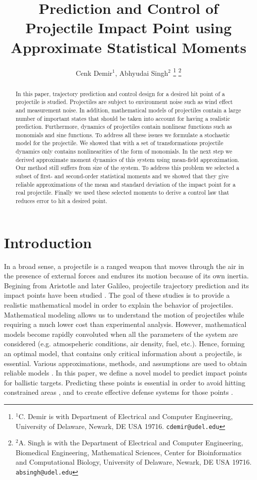 \documentclass[letterpaper, 10 pt, conference]{ieeeconf}  %
\title{\LARGE \bf
Prediction and Control of Projectile Impact Point using Approximate Statistical Moments}
\author{Cenk Demir$^{1}$, Abhyudai Singh$^{2}$
\thanks{$^{1}$C. Demir is with Department of Electrical and Computer Engineering, University of Delaware, Newark, DE USA 19716. {\tt\small cdemir@udel.edu}}
\thanks{$^{2}$A. Singh is with the Department of Electrical and Computer Engineering, Biomedical Engineering, Mathematical Sciences, Center for Bioinformatics and Computational Biology, University of Delaware, Newark, DE USA 19716.
{\tt\small absingh@udel.edu}}}
\begin{document}
\maketitle
\thispagestyle{empty}
\pagestyle{empty}


\begin{abstract}
In this paper, trajectory prediction and control design for a desired hit point of a projectile is studied. Projectiles are subject to environment noise such as wind effect and measurement noise. In addition, mathematical models of projectiles contain a large number of important states that should be taken into account for having a realistic prediction. Furthermore, dynamics of projectiles contain nonlinear functions such as monomials and sine functions. To address all these issues we formulate a stochastic model for the projectile. We showed that with a set of transformations projectile dynamics only contains nonlinearities of the form of monomials. In the next step we derived approximate moment dynamics of this system using mean-field approximation.  Our method still suffers from size of the system. To address this problem we selected a subset of first- and second-order statistical moments and we showed that they give reliable approximations of the mean and standard deviation of the impact point for a real projectile. Finally we used these selected moments to derive a control law that reduces error to hit a desired point.
\end{abstract}

\section{Introduction}
In a broad sense, a projectile is a ranged weapon that moves through the air in the presence of external forces and endures its motion because of its own inertia. Begining from Aristotle and later Galileo, projectile trajectory prediction and its impact points have been studied \cite{hussey1983physics,galileo}. The goal of these studies is to provide a realistic mathematical model in order to explain the behavior of projectiles. Mathematical modeling allows us to understand the motion of projectiles while requiring a much lower cost than experimental analysis. However, mathematical models become rapidly convoluted when all the parameters of the system are considered (e.g. atmospeheric conditions, air density, fuel, etc.). Hence, forming an optimal model, that contains only  critical information about a projectile, is essential. Various approximations, methods, and assumptions are used to obtain reliable models \cite{mavris1998stochastic, charters1955linearized, guidos2002linearized ,zhao2015finite}. In this paper, we define a novel model to predict impact points for ballistic targets. Predicting these points is essential in order to avoid hitting constrained areas \cite{rogers2015stochastic}, and to create effective defense systems for those points \cite{finn1986value}.
\end{document}
